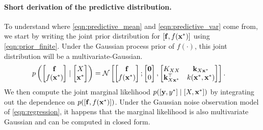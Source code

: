 \paragraph{Short derivation of the predictive distribution.}
To understand where \cref{eqn:predictive_mean} and \cref{eqn:predictive_var} come from, we start by writing the joint prior distribution for $[\mathbf{f}, f(\mathbf{x}^*)]$ using \cref{eqn:prior_finite}.
Under the Gaussian process prior of $f(\cdot)$, this joint distribution will be a multivariate-Gaussian.
%
\begin{align*}
  p \left(
    \begin{bmatrix} \mathbf{f} \\ f(\mathbf{x}^*) \end{bmatrix} \mid
    \begin{bmatrix} X \\ \mathbf{x}^* \end{bmatrix}
  \right)
  &= \mathcal{N} \left[ 
    \begin{bmatrix} \mathbf{f} \\ f(\mathbf{x}^*) \end{bmatrix} ;
    \begin{bmatrix} \mathbf{0} \\ 0 \end{bmatrix}
  , 
    \begin{bmatrix}
      K_{X X}    & \mathbf{k}_{X \mathbf{x}^*} \\
      \mathbf{k}_{X \mathbf{x}^*}^\top   & k(\mathbf{x}^*, \mathbf{x}^*)
    \end{bmatrix}
   \right].
\end{align*}
%
We then compute the joint marginal likelihood $p( [ \mathbf{y}, y^* ] \mid [ X, \mathbf{x}^* ] )$ by integrating out the dependence on $p( [\mathbf{f}, f(\mathbf{x}^*)] )$.
Under the Gaussian noise observation model of \cref{eqn:regression}, it happens that the marginal likelihood is also multivariate Gaussian and can be computed in closed form.
%
